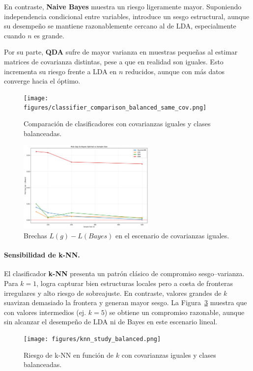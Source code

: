 \documentclass[10pt]{article}
\begin{document}
En contraste, \textbf{Naive Bayes} muestra un riesgo ligeramente mayor. Suponiendo independencia condicional entre variables, 
introduce un sesgo estructural, aunque su desempeño se mantiene razonablemente cercano al de LDA, especialmente cuando $n$ es grande.  

Por su parte, \textbf{QDA} sufre de mayor varianza en muestras pequeñas al estimar matrices de covarianza distintas, 
pese a que en realidad son iguales. Esto incrementa su riesgo frente a LDA en $n$ reducidos, aunque con más datos converge hacia el óptimo.  

\begin{figure}[H]
    \centering
    \texttt{[image: figures/classifier\_comparison\_balanced\_same\_cov.png]}
    \caption{Comparación de clasificadores con covarianzas iguales y clases balanceadas.}
    \label{fig:risk_samecov}
\end{figure}

\begin{figure}[H]
    \centering
    \includegraphics[width=0.60\textwidth]{figures/risk_gaps.png}
    \caption{Brechas $L(g)-L(Bayes)$ en el escenario de covarianzas iguales.}
    \label{fig:riskgap_samecov}
\end{figure}

\paragraph{Sensibilidad de k-NN.}
El clasificador \textbf{k-NN} presenta un patrón clásico de compromiso sesgo–varianza. 
Para $k=1$, logra capturar bien estructuras locales pero a costa de fronteras irregulares y alto riesgo de sobreajuste. 
En contraste, valores grandes de $k$ suavizan demasiado la frontera y generan mayor sesgo. 
La Figura~\ref{fig:knn_samecov} muestra que con valores intermedios (ej. $k=5$) se obtiene un compromiso razonable, 
aunque sin alcanzar el desempeño de LDA ni de Bayes en este escenario lineal.

\begin{figure}[H]
    \centering
    \texttt{[image: figures/knn\_study\_balanced.png]}
    \caption{Riesgo de k-NN en función de $k$ con covarianzas iguales y clases balanceadas.}
    \label{fig:knn_samecov}
\end{figure}
\end{document}
